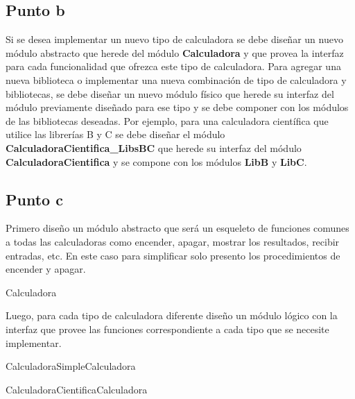 \documentclass[12pt,a4paper,fleqn]{article}
\begin{document}
\subsection{Punto b}
Si se desea implementar un nuevo tipo de calculadora se debe diseñar un nuevo
módulo abstracto que herede del módulo \textbf{Calculadora} y que provea la interfaz
para cada funcionalidad que ofrezca este tipo de calculadora.
Para agregar una nueva biblioteca o implementar una nueva combinación de tipo
de calculadora y bibliotecas, se debe diseñar un nuevo módulo físico que herede su interfaz
del módulo previamente diseñado para ese tipo y se debe componer con los módulos
de las bibliotecas deseadas.
Por ejemplo, para una calculadora científica que utilice las librerías B y C se debe
diseñar el módulo \textbf{CalculadoraCientifica\_LibsBC} que herede su interfaz del módulo
\textbf{CalculadoraCientifica} y se compone con los módulos \textbf{LibB} y \textbf{LibC}.

\subsection{Punto c}

Primero diseño un módulo abstracto que será un esqueleto de funciones comunes a todas las
calculadoras como encender, apagar, mostrar los resultados, recibir entradas, etc.
En este caso para simplificar solo presento los procedimientos de encender y apagar.

\begin{module}{Calculadora}
\eproc
{}
\end{module}

Luego, para cada tipo de calculadora diferente diseño un módulo lógico con la interfaz
que provee las funciones correspondiente a cada tipo que se necesite implementar.

\begin{hmodule}{CalculadoraSimple}{Calculadora}
\eproc
{}
\end{hmodule}

\begin{hmodule}{CalculadoraCientifica}{Calculadora}
\eproc
{}
\end{hmodule}
\end{document}
